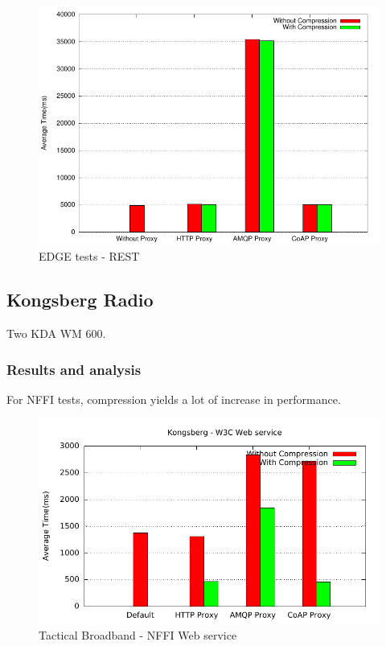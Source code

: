\begin{figure}[H]
\center
\includegraphics[scale=0.75]{../results/edge/rest/result.pdf}
\caption{EDGE  tests - REST}
\end{figure}

\subsection{Kongsberg Radio}

Two KDA WM 600.


\subsubsection{Results and analysis}

For NFFI tests, compression yields a lot of increase in performance.

\begin{figure}[H]
\center
\includegraphics[scale=0.75]{../results/kongsberg/nffi/out.pdf}
\caption{Tactical Broadband - NFFI Web service}
\end{figure}

